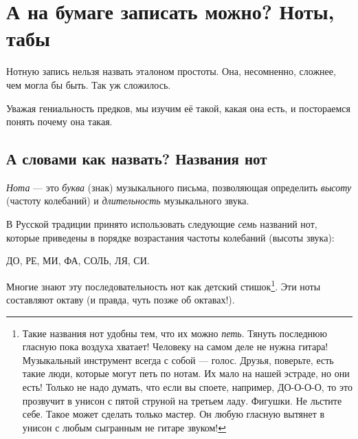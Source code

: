 \chapter{А на бумаге записать можно? Ноты, табы}
\label{ch:notes}

Нотную запись нельзя назвать эталоном простоты. Она, несомненно, сложнее, чем могла бы быть. Так уж сложилось.

Уважая гениальность предков, мы изучим её такой, какая она есть, и постораемся понять почему она такая.

%


\section{А словами как назвать? Названия нот}
\label{ch:notes:names}

\emph{Нота} --- это \emph{буква} (знак) музыкального письма, позволяющая определить \emph{высоту} (частоту колебаний) и \emph{длительность} музыкального звука. 

В Русской традиции принято использовать следующие \emph{семь} названий нот, которые приведены в порядке возрастания частоты колебаний (высоты звука): 
\begin{center}
    ДО, РЕ, МИ, ФА, СОЛЬ, ЛЯ, СИ. 
\end{center}

Многие знают эту последовательность нот как детский стишок\footnote{Такие названия нот удобны тем, что их можно \emph{петь}. Тянуть последнюю гласную пока воздуха хватает! Человеку на самом деле не нужна гитара! Музыкальный инструмент всегда с собой --- голос. Друзья, поверьте, есть такие люди, которые могут петь по нотам. Их мало на нашей эстраде, но они есть! Только не надо думать, что если вы споете, например, ДО-О-О-О, то это прозвучит в унисон с пятой струной на третьем ладу. Фигушки. Не льстите себе. Такое может сделать только мастер. Он любую гласную вытянет в унисон с любым сыгранным не гитаре звуком!}. Эти ноты составляют октаву (и правда, чуть позже об октавах!).

